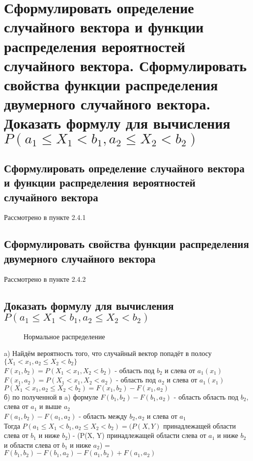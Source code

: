 \section{Сформулировать определение случайного вектора и функции распределения вероятностей случайного вектора. Сформулировать свойства функции распределения двумерного случайного вектора. Доказать формулу для вычисления $P(a_{1} \leqslant X_{1} < b_{1}, a_{2} \leqslant X_{2} < b_{2})$}
\subsection{Сформулировать определение случайного вектора и функции распределения вероятностей случайного вектора}
Рассмотрено в пункте 2.4.1
\subsection{Сформулировать свойства функции распределения двумерного случайного вектора}
Рассмотрено в пункте 2.4.2
\subsection{Доказать формулу для вычисления $P(a_{1} \leqslant X_{1} < b_{1}, a_{2} \leqslant X_{2} < b_{2})$}
\begin{figure}[H]
	\caption{Нормальное распределение}
\end{figure}
a) Найдём вероятность того, что случайный вектор попадёт в полосу $\{X_{1} < x_{1}, a_{2} \leqslant X_{2} < b_{2}\}$\\
$F(x_{1}, b_{2}) = P(X_{1} < x_{1}, X_{2} < b_{2})$ - область под $b_{2}$ и слева от $a_{1} (x_{1})$\\
$F(x_{1}, a_{2}) = P(X_{1} < x_{1}, X_{2} < a_{2})$ - область под $a_{2}$ и слева от $a_{1} (x_{1})$\\
$P(X_{1} < x_{1}, a_{2} \leqslant  X_{2} < b_{2}) = F(x_{1}, b_{2}) - F(x_{1}, a_{2})$\\
б) по полученной в a) формуле $F(b_{1}, b_{2}) - F(b_{1}, a_{2})$ - область область под $b_{2}$, слева от $a_{1}$ и выше $a_{2}$\\
$F(a_{1}, b_{2}) - F(a_{1}, a_{2})$ - область между $b_{2}, a_{2}$ и слева от $a_{1}$\\
Тогда  $P(a_{1} \leqslant X_{1} < b_{1}, a_{2} \leqslant X_{2} < b_{2}) = (P(X, Y)$ принадлежащей области слева от $b_{1}$ и ниже $b_{2}$) - (P(X, Y) принадлежащей области слева от $a_{1}$ и ниже $b_{2}$ и области слева от $b_{1}$ и ниже $a_{2}$) = $F(b_{1}, b_{2}) - F(b_{1}, a_{2}) - F(a_{1}, b_{2}) + F(a_{1}, a_{2})$\\

